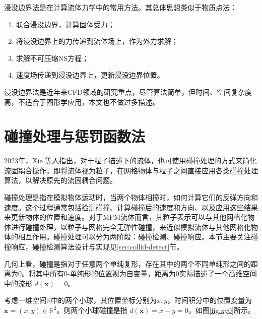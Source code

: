 浸没边界法是在计算流体力学中的常用方法。其总体思想类似于物质点法：
\begin{enumerate}
  \item 联合浸没边界，计算固体受力；
  \item 将浸没边界上的力传递到流体场上，作为外力求解；
  \item 求解不可压缩NS方程；
  \item 速度场传递到浸没边界上，更新浸没边界位置。
\end{enumerate}
浸没边界法是近年来CFD领域的研究重点，尽管算法简单，但时间、空间复杂度高，不适合于图形学应用，本文也不做过多描述。

\section{碰撞处理与惩罚函数法}\label{sec:collision}

2023年，Xie 等人指出，对于粒子描述下的流体，也可使用碰撞处理的方式来简化流固耦合操作。即将流体视为粒子，在网格物体与粒子之间直接应用各类碰撞处理算法，以解决原先的流固耦合问题。

碰撞处理是指在模拟物体运动时，当两个物体相撞时，如何计算它们的反弹方向和速度。这个过程通常包括检测碰撞、计算碰撞后的速度和方向、以及应用这些结果来更新物体的位置和速度。对于MPM流体而言，其粒子表示可以与其他网格化物体进行碰撞处理，以粒子与网格完全无弹性碰撞，来近似模拟流体与其他网格化物体的相互作用。碰撞处理可以分为两阶段：碰撞检测、碰撞响应。本节主要关注碰撞响应，碰撞检测算法设计与实现见\ref{sec:collid-detect}节。%

几何上看，碰撞是指对于任意两个单纯复形，存在其中的两个不同单纯形之间的距离为$0$。将其中所有0-单纯形的位置视为自变量，距离为$0$实际描述了一个高维空间中的流形 $d(\mathbf x) = 0$。

考虑一维空间$\mathbb R$中的两个小球，其位置坐标分别为$x, y$，时间积分中的位置变量为$\mathbf x= (x, y)\in \mathbb R^{2}$。则两个小球碰撞是指 $d(\mathbf x) = x-y = 0$，如图\ref{fig:xy0}所示。

